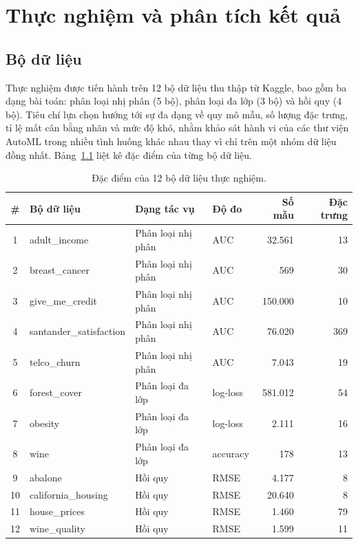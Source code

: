 \chapter{Thực nghiệm và phân tích kết quả}
\label{ch:thucnghiem}

\section{Bộ dữ liệu}
\label{sec:dulieu}
Thực nghiệm được tiến hành trên 12 bộ dữ liệu thu thập từ Kaggle, bao gồm ba dạng
bài toán: phân loại nhị phân (5 bộ), phân loại đa lớp (3 bộ) và hồi quy (4 bộ).
Tiêu chí lựa chọn hướng tới sự đa dạng về quy mô mẫu, số lượng đặc trưng, tỉ lệ
mất cân bằng nhãn và mức độ khó, nhằm khảo sát hành vi của các thư viện AutoML
trong nhiều tình huống khác nhau thay vì chỉ trên một nhóm dữ liệu đồng nhất.
Bảng~\ref{tab:dulieu} liệt kê đặc điểm của từng bộ dữ liệu.

\begin{table}[H]
  \centering
  \small
  \caption{Đặc điểm của 12 bộ dữ liệu thực nghiệm.}
  \label{tab:dulieu}
  \renewcommand{\arraystretch}{1.15}
  \begin{tabularx}{\linewidth}{@{}c >{\raggedright\arraybackslash}X l l r r@{}}
    \toprule
    \textbf{\#} & \textbf{Bộ dữ liệu} & \textbf{Dạng tác vụ} & \textbf{Độ đo} & \textbf{Số mẫu} & \textbf{Đặc trưng} \\
    \midrule
    1  & adult\_income            & Phân loại nhị phân & AUC      & 32.561  & 13 \\
    2  & breast\_cancer           & Phân loại nhị phân & AUC      & 569     & 30 \\
    3  & give\_me\_credit         & Phân loại nhị phân & AUC      & 150.000 & 10 \\
    4  & santander\_satisfaction  & Phân loại nhị phân & AUC      & 76.020  & 369 \\
    5  & telco\_churn             & Phân loại nhị phân & AUC      & 7.043   & 19 \\
    \midrule
    6  & forest\_cover            & Phân loại đa lớp   & log-loss & 581.012 & 54 \\
    7  & obesity                  & Phân loại đa lớp   & log-loss & 2.111   & 16 \\
    8  & wine                     & Phân loại đa lớp   & accuracy & 178     & 13 \\
    \midrule
    9  & abalone                  & Hồi quy            & RMSE     & 4.177   & 8 \\
    10 & california\_housing      & Hồi quy            & RMSE     & 20.640  & 8 \\
    11 & house\_prices            & Hồi quy            & RMSE     & 1.460   & 79 \\
    12 & wine\_quality            & Hồi quy            & RMSE     & 1.599   & 11 \\
    \bottomrule
  \end{tabularx}
\end{table}


